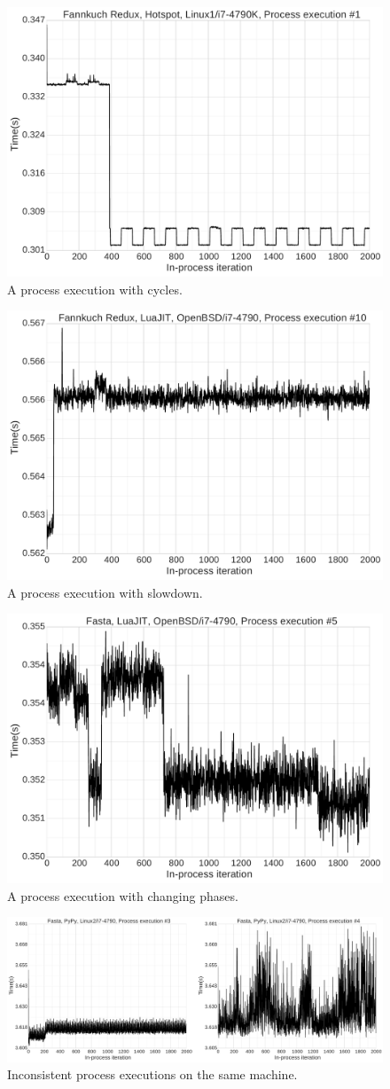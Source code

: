 \documentclass[preprint]{sigplanconf}
\begin{document}

\begin{figure}
\includegraphics[width=.5\textwidth]{examples_v2_results/bad_cycles.pdf}
\caption{A process execution with cycles.}
\label{fig:cycles}
\end{figure}


\begin{figure}
\includegraphics[width=.5\textwidth]{examples_v2_results/bad_slowdown.pdf}
\caption{A process execution with slowdown.}
\label{fig:slowdown}
\end{figure}

\begin{figure}
\includegraphics[width=.5\textwidth]{examples_v2_results/bad_phases.pdf}
\caption{A process execution with changing phases.}
\label{fig:phases}
\end{figure}

\begin{figure}
\includegraphics[width=\textwidth]{examples_v2_results/bad_inconsistent.pdf}
\caption{Inconsistent process executions on the same machine.}
\label{fig:inconsistent}
\end{figure}
\end{document}
